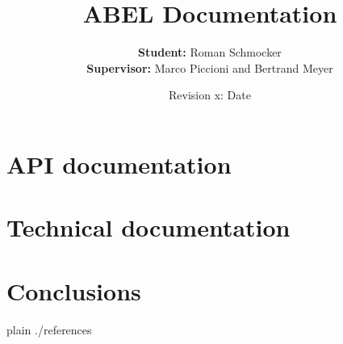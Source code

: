 \documentclass[a4paper,12pt]{article}
\title {ABEL Documentation}
\author {
	\textbf{Student:} Roman Schmocker \\
	\textbf{Supervisor:} Marco Piccioni and Bertrand Meyer  
}
\date {Revision x: Date}
\begin{document}
\maketitle

\part{API documentation}


%

\part{Technical documentation}


\part{Conclusions}


{{{
 {plain}
 {./references}
}}}
\end{document}
